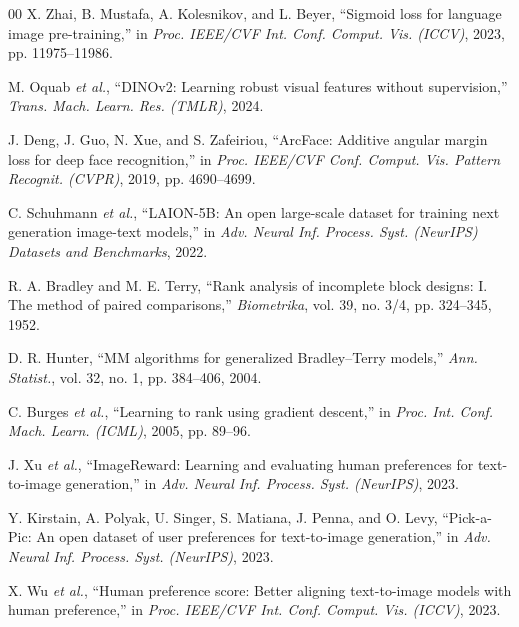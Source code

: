 \documentclass[conference]{IEEEtran}
\begin{document}
\begin{thebibliography}{00}
 X. Zhai, B. Mustafa, A. Kolesnikov, and L. Beyer, ``Sigmoid loss for language image pre-training,'' in \emph{Proc. IEEE/CVF Int. Conf. Comput. Vis. (ICCV)}, 2023, pp. 11975--11986.

 M. Oquab \emph{et al.}, ``DINOv2: Learning robust visual features without supervision,'' \emph{Trans. Mach. Learn. Res. (TMLR)}, 2024.

 J. Deng, J. Guo, N. Xue, and S. Zafeiriou, ``ArcFace: Additive angular margin loss for deep face recognition,'' in \emph{Proc. IEEE/CVF Conf. Comput. Vis. Pattern Recognit. (CVPR)}, 2019, pp. 4690--4699.

 C. Schuhmann \emph{et al.}, ``LAION-5B: An open large-scale dataset for training next generation image-text models,'' in \emph{Adv. Neural Inf. Process. Syst. (NeurIPS) Datasets and Benchmarks}, 2022.

 R. A. Bradley and M. E. Terry, ``Rank analysis of incomplete block designs: I. The method of paired comparisons,'' \emph{Biometrika}, vol. 39, no. 3/4, pp. 324--345, 1952.

 D. R. Hunter, ``MM algorithms for generalized Bradley--Terry models,'' \emph{Ann. Statist.}, vol. 32, no. 1, pp. 384--406, 2004.

 C. Burges \emph{et al.}, ``Learning to rank using gradient descent,'' in \emph{Proc. Int. Conf. Mach. Learn. (ICML)}, 2005, pp. 89--96.

 J. Xu \emph{et al.}, ``ImageReward: Learning and evaluating human preferences for text-to-image generation,'' in \emph{Adv. Neural Inf. Process. Syst. (NeurIPS)}, 2023.

 Y. Kirstain, A. Polyak, U. Singer, S. Matiana, J. Penna, and O. Levy, ``Pick-a-Pic: An open dataset of user preferences for text-to-image generation,'' in \emph{Adv. Neural Inf. Process. Syst. (NeurIPS)}, 2023.

 X. Wu \emph{et al.}, ``Human preference score: Better aligning text-to-image models with human preference,'' in \emph{Proc. IEEE/CVF Int. Conf. Comput. Vis. (ICCV)}, 2023.

\end{thebibliography}
\end{document}
